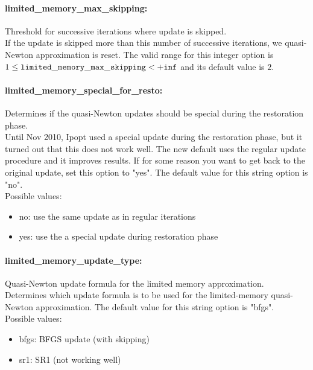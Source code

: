 \paragraph{limited\_memory\_max\_skipping:}\label{opt:limited_memory_max_skipping} Threshold for successive iterations where update is skipped. \\
 If the update is skipped more than this number of successive iterations, we quasi-Newton approximation is reset. The valid range for this integer option is
$1 \le {\tt limited\_memory\_max\_skipping } <  {\tt +inf}$
and its default value is $2$.


\paragraph{limited\_memory\_special\_for\_resto:}\label{opt:limited_memory_special_for_resto} Determines if the quasi-Newton updates should be special during the restoration phase. \\
 Until Nov 2010, Ipopt used a special update during the restoration phase, but it turned out that this does not work well.  The new default uses the regular update procedure and it improves results.  If for some reason you want to get back to the original update, set this option to "yes". The default value for this string option is "no".
\\ 
Possible values:
\begin{itemize}
   \item no: use the same update as in regular iterations
   \item yes: use the a special update during restoration phase
\end{itemize}

\paragraph{limited\_memory\_update\_type:}\label{opt:limited_memory_update_type} Quasi-Newton update formula for the limited memory approximation. \\
 Determines which update formula is to be used for the limited-memory quasi-Newton approximation. The default value for this string option is "bfgs".
\\ 
Possible values:
\begin{itemize}
   \item bfgs: BFGS update (with skipping)
   \item sr1: SR1 (not working well)
\end{itemize}

